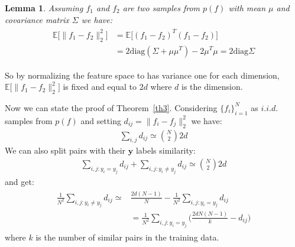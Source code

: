 \documentclass[10pt,journal,compsoc]{IEEEtran}
\newtheorem{lemma}[theorem]{Lemma}
\begin{document}
\begin{lemma}
	Assuming $f_1$ and $f_2$ are two samples from $p(f)$ with mean $\mu$ and covariance matrix $\Sigma$ we have:
	\begin{align*}
	\begin{split}
	\mathds{E} \Big[ \|f_1 - f_2\|_2^2 \Big] &= \mathds{E} \Big[(f_1-f_2)^T(f_1-f_2)\Big]\\ &= 2 \text{diag}(\Sigma + \mu \mu^T) - 2\mu^T \mu = 2 \text{diag}\Sigma
	\end{split}
	\end{align*}
\end{lemma}
So by normalizing the feature space to has variance one for each dimension, $\mathds{E} \Big[ \|f_1 - f_2\|_2^2 \Big]$ is fixed and equal to $2d$ where $d$ is the dimension.

Now we can state the proof of Theorem~\ref{th3}. Considering $\{f_i\}_{i=1}^N$ as $i.i.d.$ samples from $p(f)$ and setting $d_{ij} = \|f_i - f_j\|_2^2$ we have:
\begin{align*}
\sum_{i,j} d_{ij} \simeq \binom{N}{2} 2d
\end{align*}
We can also split pairs with their $\textbf{y}$ labels similarity:
\begin{align*}
\sum_{i,j: y_i=y_j} d_{ij} + \sum_{i,j: y_i\neq y_j} d_{ij}  \simeq \binom{N}{2} 2d
\end{align*}
and get:
\begin{align*}
\begin{split}
\frac{1}{N^2}\sum_{i,j: y_i\neq y_j} d_{ij}   \simeq &\frac{2d(N-1)}{N} - \frac{1}{N^2}\sum_{i,j: y_i= y_j} d_{ij}\\
& = \frac{1}{N^2} \sum_{i,j: y_i= y_j}\big( \frac{2dN(N-1)}{k} - d_{ij} \big)
\end{split}
\end{align*}
where $k$ is the number of similar pairs in the training data.  
\end{document}
